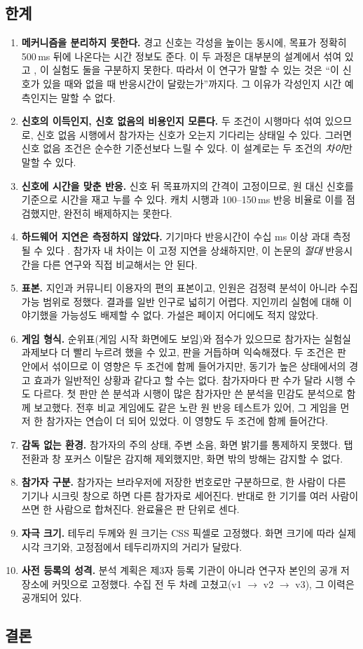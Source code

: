 \subsection{한계}\label{sec:limits}
\begin{enumerate}
\item \textbf{메커니즘을 분리하지 못한다.} 경고 신호는 각성을 높이는 동시에, 목표가 정확히 500\,ms 뒤에 나온다는 시간 정보도 준다.
이 두 과정은 대부분의 설계에서 섞여 있고 \citep{weinbach2012}, 이 실험도 둘을 구분하지 못한다.
따라서 이 연구가 말할 수 있는 것은 ``이 신호가 있을 때와 없을 때 반응시간이 달랐는가''까지다. 그 이유가 각성인지 시간 예측인지는 말할 수 없다.
\item \textbf{신호의 이득인지, 신호 없음의 비용인지 모른다.} 두 조건이 시행마다 섞여 있으므로, 신호 없음 시행에서 참가자는 신호가 오는지 기다리는 상태일 수 있다.
그러면 신호 없음 조건은 순수한 기준선보다 느릴 수 있다. 이 설계로는 두 조건의 \emph{차이}만 말할 수 있다.
\item \textbf{신호에 시간을 맞춘 반응.} 신호 뒤 목표까지의 간격이 고정이므로, 원 대신 신호를 기준으로 시간을 재고 누를 수 있다.
캐치 시행과 100--150\,ms 반응 비율로 이를 점검했지만, 완전히 배제하지는 못한다.
\item \textbf{하드웨어 지연은 측정하지 않았다.} 기기마다 반응시간이 수십 ms 이상 과대 측정될 수 있다 \citep{pronk2020}.
참가자 내 차이는 이 고정 지연을 상쇄하지만, 이 논문의 \emph{절대} 반응시간을 다른 연구와 직접 비교해서는 안 된다.
\item \textbf{표본.} 지인과 커뮤니티 이용자의 편의 표본이고, 인원은 검정력 분석이 아니라 수집 가능 범위로 정했다. 결과를 일반 인구로 넓히기 어렵다.
지인끼리 실험에 대해 이야기했을 가능성도 배제할 수 없다. 가설은 페이지 어디에도 적지 않았다.
\item \textbf{게임 형식.} 순위표(게임 시작 화면에도 보임)와 점수가 있으므로 참가자는 실험실 과제보다 더 빨리 누르려 했을 수 있고, 판을 거듭하며 익숙해졌다.
두 조건은 판 안에서 섞이므로 이 영향은 두 조건에 함께 들어가지만, 동기가 높은 상태에서의 경고 효과가 일반적인 상황과 같다고 할 수는 없다.
참가자마다 판 수가 달라 시행 수도 다르다. 첫 판만 쓴 분석과 시행이 많은 참가자만 쓴 분석을 민감도 분석으로 함께 보고했다.
전후 비교 게임에도 같은 노란 원 반응 테스트가 있어, 그 게임을 먼저 한 참가자는 연습이 더 되어 있었다. 이 영향도 두 조건에 함께 들어간다.
\item \textbf{감독 없는 환경.} 참가자의 주의 상태, 주변 소음, 화면 밝기를 통제하지 못했다. 탭 전환과 창 포커스 이탈은 감지해 제외했지만, 화면 밖의 방해는 감지할 수 없다.
\item \textbf{참가자 구분.} 참가자는 브라우저에 저장한 번호로만 구분하므로, 한 사람이 다른 기기나 시크릿 창으로 하면 다른 참가자로 세어진다. 반대로 한 기기를 여러 사람이 쓰면 한 사람으로 합쳐진다.
완료율은 판 단위로 센다.
\item \textbf{자극 크기.} 테두리 두께와 원 크기는 CSS 픽셀로 고정했다. 화면 크기에 따라 실제 시각 크기와, 고정점에서 테두리까지의 거리가 달랐다.
\item \textbf{사전 등록의 성격.} 분석 계획은 제3자 등록 기관이 아니라 연구자 본인의 공개 저장소에 커밋으로 고정했다. 수집 전 두 차례 고쳤고(v1 $\to$ v2 $\to$ v3), 그 이력은 공개되어 있다.
\end{enumerate}

\subsection{결론}
